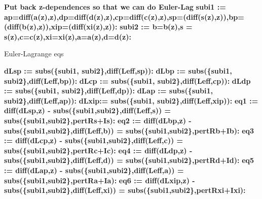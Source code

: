 \begin{maplegroup}
\textbf{Put back z-dependences so that we can do Euler-Lag}
\textbf{subi1 := ap=diff(a(z),z),dp=diff(d(z),z),cp=diff(c(z),z),sp=(diff(s(z),z)),bp=(diff(b(z),z)),xip=(diff(xi(z),z)):}
\textbf{subi2 := b=b(z),s = s(z),c=c(z),xi=xi(z),a=a(z),d=d(z):}\end{maplegroup}
\begin{maplegroup}
\begin{mapleinput}
\end{mapleinput}
\end{maplegroup}
\begin{maplegroup}
\begin{mapleinput}
\end{mapleinput}
\end{maplegroup}
\begin{maplegroup}
\begin{mapleinput}
\end{mapleinput}
\end{maplegroup}
\begin{maplegroup}
\begin{Maple Normal}{
Euler-Lagrange eqs}\end{Maple Normal}

\textbf{dLsp := subs(\{subi1, subi2\},diff(Leff,sp)):}
\textbf{dLbp := subs(\{subi1, subi2\},diff(Leff,bp)):}
\textbf{dLcp := subs(\{subi1, subi2\},diff(Leff,cp)):}
\textbf{dLdp := subs(\{subi1, subi2\},diff(Leff,dp)):}
\textbf{dLap := subs(\{subi1, subi2\},diff(Leff,ap)):}
\textbf{dLxip:= subs(\{subi1, subi2\},diff(Leff,xip)):}
\textbf{eq1 := diff(dLsp,z) - subs(\{subi1,subi2\},diff(Leff,s)) = subs(\{subi1,subi2\},pertRs+Is):}
\textbf{eq2 := diff(dLbp,z) - subs(\{subi1,subi2\},diff(Leff,b)) = subs(\{subi1,subi2\},pertRb+Ib):}
\textbf{eq3 := diff(dLcp,z) - subs(\{subi1,subi2\},diff(Leff,c)) = subs(\{subi1,subi2\},pertRc+Ic):}
\textbf{eq4 := diff(dLdp,z) - subs(\{subi1,subi2\},diff(Leff,d)) = subs(\{subi1,subi2\},pertRd+Id):}
\textbf{eq5 := diff(dLap,z) - subs(\{subi1,subi2\},diff(Leff,a)) = subs(\{subi1,subi2\},pertRa+Ia):}
\textbf{eq6 := diff(dLxip,z) - subs(\{subi1,subi2\},diff(Leff,xi)) = subs(\{subi1,subi2\},pertRxi+Ixi):}\end{maplegroup}
